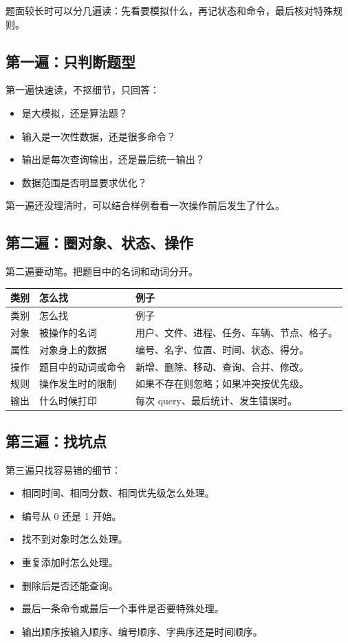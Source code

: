 题面较长时可以分几遍读：先看要模拟什么，再记状态和命令，最后核对特殊规则。

\subsection{第一遍：只判断题型}

第一遍快速读，不抠细节，只回答：

\begin{itemize}
  \item 是大模拟，还是算法题？
  \item 输入是一次性数据，还是很多命令？
  \item 输出是每次查询输出，还是最后统一输出？
  \item 数据范围是否明显要求优化？
\end{itemize}

第一遍还没理清时，可以结合样例看看一次操作前后发生了什么。

\subsection{第二遍：圈对象、状态、操作}

第二遍要动笔。把题目中的名词和动词分开。

\begin{longtable}{p{3cm}p{5cm}p{6cm}}
\toprule
类别 & 怎么找 & 例子 \\
\midrule
\endfirsthead
\toprule
类别 & 怎么找 & 例子 \\
\midrule
\endhead
对象 & 被操作的名词 & 用户、文件、进程、任务、车辆、节点、格子。 \\
属性 & 对象身上的数据 & 编号、名字、位置、时间、状态、得分。 \\
操作 & 题目中的动词或命令 & 新增、删除、移动、查询、合并、修改。 \\
规则 & 操作发生时的限制 & 如果不存在则忽略；如果冲突按优先级。 \\
输出 & 什么时候打印 & 每次 query、最后统计、发生错误时。 \\
\bottomrule
\end{longtable}

\subsection{第三遍：找坑点}

第三遍只找容易错的细节：

\begin{itemize}
  \item 相同时间、相同分数、相同优先级怎么处理。
  \item 编号从 0 还是 1 开始。
  \item 找不到对象时怎么处理。
  \item 重复添加时怎么处理。
  \item 删除后是否还能查询。
  \item 最后一条命令或最后一个事件是否要特殊处理。
  \item 输出顺序按输入顺序、编号顺序、字典序还是时间顺序。
\end{itemize}

